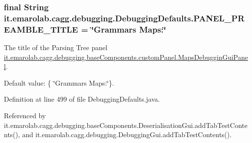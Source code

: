 \hypertarget{classit_1_1emarolab_1_1cagg_1_1debugging_1_1DebuggingDefaults_a91fc7a0d4cfd509d0d36de15fdfa3283}{
\subsubsection[{P\-A\-N\-E\-L\-\_\-\-P\-R\-E\-A\-M\-B\-L\-E\-\_\-\-T\-I\-T\-L\-E}]{\setlength{\rightskip}{0pt plus 5cm}final String it.\-emarolab.\-cagg.\-debugging.\-Debugging\-Defaults.\-P\-A\-N\-E\-L\-\_\-\-P\-R\-E\-A\-M\-B\-L\-E\-\_\-\-T\-I\-T\-L\-E = \char`\"{}Grammars Maps\-:\char`\"{}\hspace{0.3cm}{\ttfamily [static]}}}\label{classit_1_1emarolab_1_1cagg_1_1debugging_1_1DebuggingDefaults_a91fc7a0d4cfd509d0d36de15fdfa3283}
The title of the Parsing Tree panel \hyperlink{classit_1_1emarolab_1_1cagg_1_1debugging_1_1baseComponents_1_1customPanel_1_1MapsDebugginGuiPanel}{it.\-emarolab.\-cagg.\-debugging.\-base\-Components.\-custom\-Panel.\-Maps\-Debuggin\-Gui\-Panel}.\par
 Default value\-: \{ \char`\"{}\-Grammars Maps\-:\char`\"{}\}. 

Definition at line 499 of file Debugging\-Defaults.\-java.



Referenced by it.\-emarolab.\-cagg.\-debugging.\-base\-Components.\-Deserialisation\-Gui.\-add\-Tab\-Test\-Contents(), and it.\-emarolab.\-cagg.\-debugging.\-Debugging\-Gui.\-add\-Tab\-Test\-Contents().

